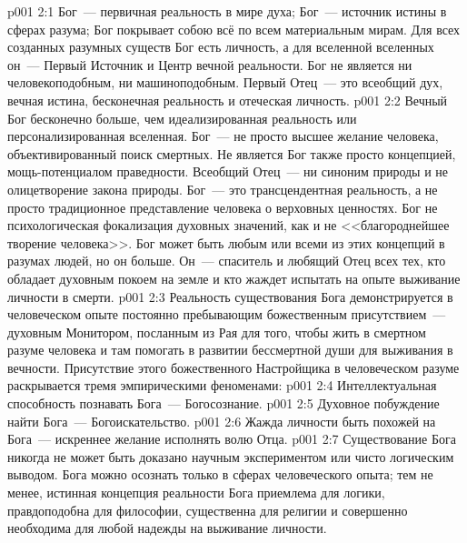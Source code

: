 \vs p001 2:1 Бог~--- первичная реальность в мире духа; Бог~--- источник истины в сферах разума; Бог покрывает собою всё по всем материальным мирам. Для всех созданных разумных существ Бог есть личность, а для вселенной вселенных он~--- Первый Источник и Центр вечной реальности. Бог не является ни человекоподобным, ни машиноподобным. Первый Отец~--- это всеобщий дух, вечная истина, бесконечная реальность и отеческая личность.
\vs p001 2:2 \pc Вечный Бог бесконечно больше, чем идеализированная реальность или персонализированная вселенная. Бог~--- не просто высшее желание человека, объективированный поиск смертных. Не является Бог также просто концепцией, мощь\hyp{}потенциалом праведности. Всеобщий Отец~--- ни синоним природы и не олицетворение закона природы. Бог~--- это трансцендентная реальность, а не просто традиционное представление человека о верховных ценностях. Бог не психологическая фокализация духовных значений, как и не <<благороднейшее творение человека>>. Бог может быть любым или всеми из этих концепций в разумах людей, но он больше. Он~--- спаситель и любящий Отец всех тех, кто обладает духовным покоем на земле и кто жаждет испытать на опыте выживание личности в смерти.
\vs p001 2:3 \pc Реальность существования Бога демонстрируется в человеческом опыте постоянно пребывающим божественным присутствием~--- духовным Монитором, посланным из Рая для того, чтобы жить в смертном разуме человека и там помогать в развитии бессмертной души для выживания в вечности. Присутствие этого божественного Настройщика в человеческом разуме раскрывается тремя эмпирическими феноменами:
\vs p001 2:4 Интеллектуальная способность познавать Бога~--- Богосознание.
\vs p001 2:5 Духовное побуждение найти Бога~--- Богоискательство.
\vs p001 2:6 Жажда личности быть похожей на Бога~--- искреннее желание исполнять волю Отца.
\vs p001 2:7 \pc Существование Бога никогда не может быть доказано научным экспериментом или чисто логическим выводом. Бога можно осознать только в сферах человеческого опыта; тем не менее, истинная концепция реальности Бога приемлема для логики, правдоподобна для философии, существенна для религии и совершенно необходима для любой надежды на выживание личности.

